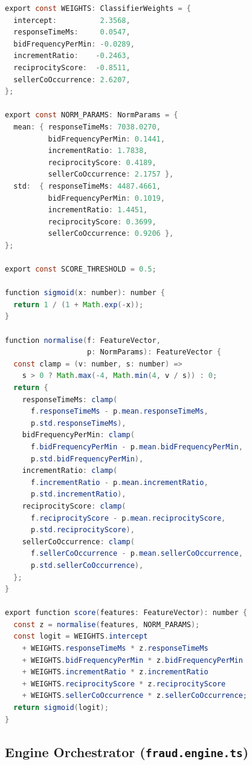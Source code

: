 \documentclass[11pt]{article}
\begin{document}
\begin{lstlisting}[language=Java,caption={Scoring and explainability functions.}]
export const WEIGHTS: ClassifierWeights = {
  intercept:          2.3568,
  responseTimeMs:     0.0547,
  bidFrequencyPerMin: -0.0289,
  incrementRatio:    -0.2463,
  reciprocityScore:  -0.8511,
  sellerCoOccurrence: 2.6207,
};

export const NORM_PARAMS: NormParams = {
  mean: { responseTimeMs: 7038.0270,
          bidFrequencyPerMin: 0.1441,
          incrementRatio: 1.7838,
          reciprocityScore: 0.4189,
          sellerCoOccurrence: 2.1757 },
  std:  { responseTimeMs: 4487.4661,
          bidFrequencyPerMin: 0.1019,
          incrementRatio: 1.4451,
          reciprocityScore: 0.3699,
          sellerCoOccurrence: 0.9206 },
};

export const SCORE_THRESHOLD = 0.5;

function sigmoid(x: number): number {
  return 1 / (1 + Math.exp(-x));
}

function normalise(f: FeatureVector,
                   p: NormParams): FeatureVector {
  const clamp = (v: number, s: number) =>
    s > 0 ? Math.max(-4, Math.min(4, v / s)) : 0;
  return {
    responseTimeMs: clamp(
      f.responseTimeMs - p.mean.responseTimeMs,
      p.std.responseTimeMs),
    bidFrequencyPerMin: clamp(
      f.bidFrequencyPerMin - p.mean.bidFrequencyPerMin,
      p.std.bidFrequencyPerMin),
    incrementRatio: clamp(
      f.incrementRatio - p.mean.incrementRatio,
      p.std.incrementRatio),
    reciprocityScore: clamp(
      f.reciprocityScore - p.mean.reciprocityScore,
      p.std.reciprocityScore),
    sellerCoOccurrence: clamp(
      f.sellerCoOccurrence - p.mean.sellerCoOccurrence,
      p.std.sellerCoOccurrence),
  };
}

export function score(features: FeatureVector): number {
  const z = normalise(features, NORM_PARAMS);
  const logit = WEIGHTS.intercept
    + WEIGHTS.responseTimeMs * z.responseTimeMs
    + WEIGHTS.bidFrequencyPerMin * z.bidFrequencyPerMin
    + WEIGHTS.incrementRatio * z.incrementRatio
    + WEIGHTS.reciprocityScore * z.reciprocityScore
    + WEIGHTS.sellerCoOccurrence * z.sellerCoOccurrence;
  return sigmoid(logit);
}
\end{lstlisting}

\subsection{Engine Orchestrator (\texttt{fraud.engine.ts})}
\end{document}
